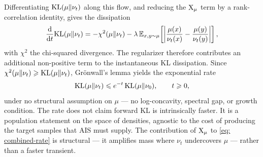 \documentclass{article}
\begin{document}
Differentiating $\mathrm{KL}(\mu\|\nu_t)$ along this flow, and reducing the $\mathrm{X}_\mu$ term by a rank-correlation identity, gives the dissipation
\begin{equation}
    \frac{\mathrm{d}}{\mathrm{d} t}\mathrm{KL}(\mu\|\nu_t) = -\chi^2(\mu\|\nu_t) - \lambda\, \mathbb E_{x,y\sim\mu}\!\left[ \left|\frac{\mu(x)}{\nu_t(x)} - \frac{\mu(y)}{\nu_t(y)}\right| \right],
    \label{eq: combined-rate}
\end{equation}
with $\chi^2$ the chi-squared divergence. The regularizer therefore contributes an additional non-positive term to the instantaneous KL dissipation. Since $\chi^2(\mu\|\nu_t) \geqslant \mathrm{KL}(\mu\|\nu_t)$, Gr\"onwall's lemma yields the exponential rate
\begin{equation}
    \mathrm{KL}(\mu\|\nu_t) \leqslant e^{-t}\,\mathrm{KL}(\mu\|\nu_0), \qquad t \geqslant 0,
    \label{eq: KL-exponential}
\end{equation}
under no structural assumption on $\mu$ --- no log-concavity, spectral gap, or growth condition. The rate does not claim forward KL is intrinsically faster. It is a population statement on the space of densities, agnostic to the cost of producing the target samples that AIS must supply. The contribution of $\mathrm{X}_\mu$ to \eqref{eq: combined-rate} is structural --- it amplifies mass where $\nu_t$ undercovers $\mu$ --- rather than a faster transient.
\end{document}
